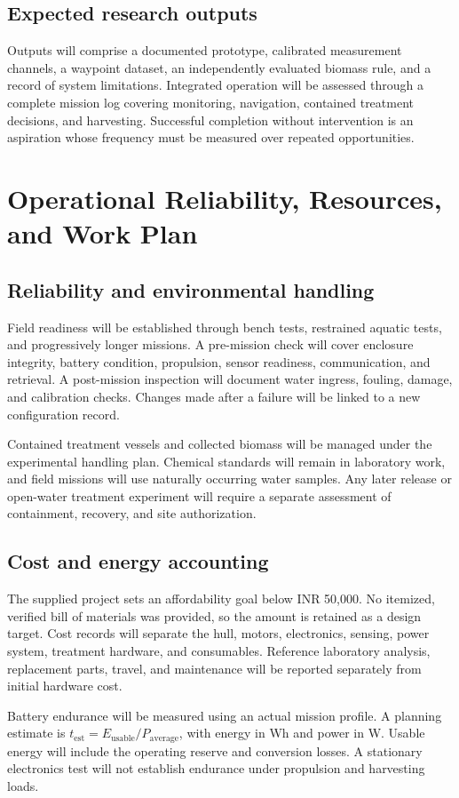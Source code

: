 \documentclass[12pt,a4paper]{article}
\newcommand{\papersection}[1]{\clearpage\section{#1}}
\begin{document}
\subsection{Expected research outputs}
Outputs will comprise a documented prototype, calibrated measurement channels, a waypoint dataset, an independently evaluated biomass rule, and a record of system limitations. Integrated operation will be assessed through a complete mission log covering monitoring, navigation, contained treatment decisions, and harvesting. Successful completion without intervention is an aspiration whose frequency must be measured over repeated opportunities.

\papersection{Operational Reliability, Resources, and Work Plan}
\subsection{Reliability and environmental handling}
Field readiness will be established through bench tests, restrained aquatic tests, and progressively longer missions. A pre-mission check will cover enclosure integrity, battery condition, propulsion, sensor readiness, communication, and retrieval. A post-mission inspection will document water ingress, fouling, damage, and calibration checks. Changes made after a failure will be linked to a new configuration record.

Contained treatment vessels and collected biomass will be managed under the experimental handling plan. Chemical standards will remain in laboratory work, and field missions will use naturally occurring water samples. Any later release or open-water treatment experiment will require a separate assessment of containment, recovery, and site authorization.

\subsection{Cost and energy accounting}
The supplied project sets an affordability goal below INR 50,000. No itemized, verified bill of materials was provided, so the amount is retained as a design target. Cost records will separate the hull, motors, electronics, sensing, power system, treatment hardware, and consumables. Reference laboratory analysis, replacement parts, travel, and maintenance will be reported separately from initial hardware cost.

Battery endurance will be measured using an actual mission profile. A planning estimate is $t_{\mathrm{est}}=E_{\mathrm{usable}}/P_{\mathrm{average}}$, with energy in Wh and power in W. Usable energy will include the operating reserve and conversion losses. A stationary electronics test will not establish endurance under propulsion and harvesting loads.
\end{document}
